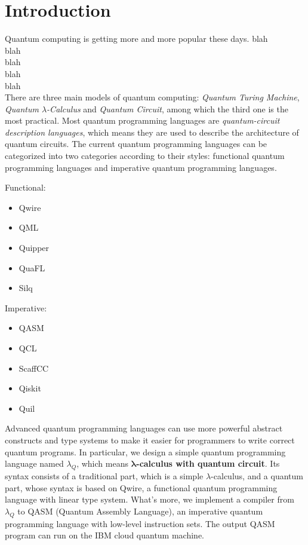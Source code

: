 \section{Introduction}
Quantum computing is getting more and more popular these days.
blah\\
blah\\
blah\\
blah\\
blah\\

There are three main models of quantum computing: \textit{Quantum Turing Machine}, \textit{Quantum $\lambda$-Calculus} and \textit{Quantum Circuit}, among which the third one is the most practical.
Most quantum programming languages are \textit{quantum-circuit description languages}, which means they are used to describe the architecture of quantum circuits.
The current quantum programming languages can be categorized into two categories according to their styles: functional quantum programming languages and imperative quantum programming languages.
\begin{multicols}{2}
  \begin{center}
      Functional:
  \end{center}
\begin{itemize}
    \item Qwire
    \item QML
    \item Quipper
    \item QuaFL
    \item Silq
\end{itemize}

  \columnbreak

  \begin{center}
          Imperative:
  \end{center}
\begin{itemize}
    \item QASM
    \item QCL
    \item ScaffCC
    \item Qiskit
    \item Quil
\end{itemize}
\end{multicols}

Advanced quantum programming languages can use more powerful abstract constructs and type systems to make it easier for programmers to write correct quantum programs.
In particular, we design a simple quantum programming language named $\lambda_Q$, which means \textbf{$\boldsymbol{\lambda}$-calculus with quantum circuit}.
Its syntax consists of a traditional part, which is a simple $\lambda$-calculus, and a quantum part, whose syntax is based on Qwire, a functional quantum programming language with linear type system.
What's more, we implement a compiler from $\lambda_Q$ to QASM (Quantum Assembly Language), an imperative quantum programming language with low-level instruction sets.
The output QASM program can run on the IBM cloud quantum machine.

